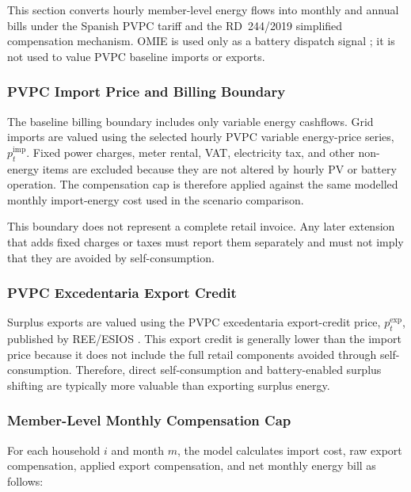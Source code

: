 This section converts hourly member-level energy flows into monthly and annual bills under the Spanish PVPC tariff and the RD~244/2019 simplified compensation mechanism. OMIE is used only as a battery dispatch signal \cite{omie2025omie}; it is not used to value PVPC baseline imports or exports.

\subsubsection{PVPC Import Price and Billing Boundary}
\label{subsec:pvpc_import_billing_boundary}

The baseline billing boundary includes only variable energy cashflows. Grid imports are valued using the selected hourly PVPC variable energy-price series, $p^{\mathrm{imp}}_t$. Fixed power charges, meter rental, VAT, electricity tax, and other non-energy items are excluded because they are not altered by hourly PV or battery operation. The compensation cap is therefore applied against the same modelled monthly import-energy cost used in the scenario comparison.

This boundary does not represent a complete retail invoice. Any later extension that adds fixed charges or taxes must report them separately and must not imply that they are avoided by self-consumption.

\subsubsection{PVPC Excedentaria Export Credit}
\label{subsec:pvpc_excedentaria_export_credit}

Surplus exports are valued using the PVPC excedentaria export-credit price, $p^{\mathrm{exp}}_t$, published by REE/ESIOS \cite{reendprecio}. This export credit is generally lower than the import price because it does not include the full retail components avoided through self-consumption. Therefore, direct self-consumption and battery-enabled surplus shifting are typically more valuable than exporting surplus energy.

\subsubsection{Member-Level Monthly Compensation Cap}
\label{subsec:member_level_monthly_compensation_cap}

For each household $i$ and month $m$, the model calculates import cost, raw export compensation, applied export compensation, and net monthly energy bill as follows:

